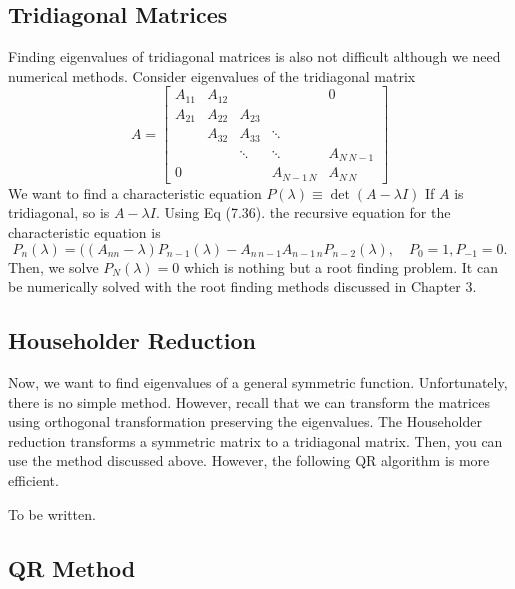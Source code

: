 {\subsection{Tridiagonal Matrices}

Finding eigenvalues of tridiagonal matrices is also not difficult although we need numerical methods. Consider  eigenvalues of the tridiagonal  matrix
\begin{equation}
A=\begin{bmatrix}
A_{11} & A_{12} &        &              &     0      \\
A_{21} & A_{22} & A_{23} &              &            \\
       & A_{32} & A_{33} & \ddots       &            \\
       &        & \ddots & \ddots       & A_{N\,N-1} \\
    0  &        &        & A_{N-1\, N}  & A_{N\,N}
\end{bmatrix}
\end{equation}
We want to find a characteristic equation $P(\lambda)\equiv \det (A-\lambda I)$
If $A$ is tridiagonal, so is $A-\lambda I$.  Using Eq (7.36).  the recursive equation for the characteristic equation is
\begin{equation}
P_n(\lambda) = ((A_{nn}-\lambda) P_{n-1}(\lambda) - A_{n\,n-1}A_{n-1\, n} P_{n-2}(\lambda), \quad P_0=1, P_{-1}=0.
\end{equation}
Then, we solve $P_N(\lambda)=0$ which is nothing but a root finding problem.  It can be numerically solved with the root finding methods discussed in Chapter 3.

\subsection{Householder Reduction}

Now, we want to find eigenvalues of a general symmetric function. Unfortunately, there is no simple method.  However, recall that we can transform the matrices using orthogonal transformation preserving the eigenvalues. The Householder reduction transforms a symmetric matrix to a tridiagonal matrix.  Then, you can use the method discussed above.  However, the following QR algorithm is more efficient.

To be written.

\subsection{QR Method}

}
